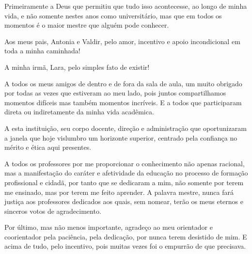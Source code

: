 Primeiramente a Deus que permitiu que tudo isso acontecesse, ao longo de minha vida, e não somente nestes anos como universitário, mas que em todos os momentos é o maior mestre que alguém pode conhecer.

Aos meus pais, Antonia e Valdir, pelo amor, incentivo e apoio incondicional em toda a minha caminhada!

A minha irmã, Lara, pelo simples fato de existir!

A todos os meus amigos de dentro e de fora da sala de aula, um muito obrigado por todas as vezes que estiveram ao meu lado, pois juntos compartilhamos momentos difíceis mas também momentos incríveis. E a todos que participaram direta ou indiretamente da minha vida acadêmica.

A esta instituição, seu corpo docente, direção e administração que oportunizaram a janela que hoje vislumbro um horizonte superior, centrado pela confiança no mérito e ética aqui presentes.

A todos os professores por me proporcionar o conhecimento não apenas racional, mas a manifestação do caráter e afetividade da educação no processo de formação profissional e cidadã, por tanto que se dedicaram a mim, não somente por terem me ensinado, mas por terem me feito aprender. A palavra mestre, nunca fará justiça aos professores dedicados aos quais, sem nomear, terão os meus eternos e sinceros votos de agradecimento.

Por último, mas não menos importante, agradeço ao meu orientador e coorientador pela paciência, pela dedicação, por nunca terem desistido de mim. E acima de tudo, pelo incentivo, pois muitas vezes foi o empurrão de que precisava.